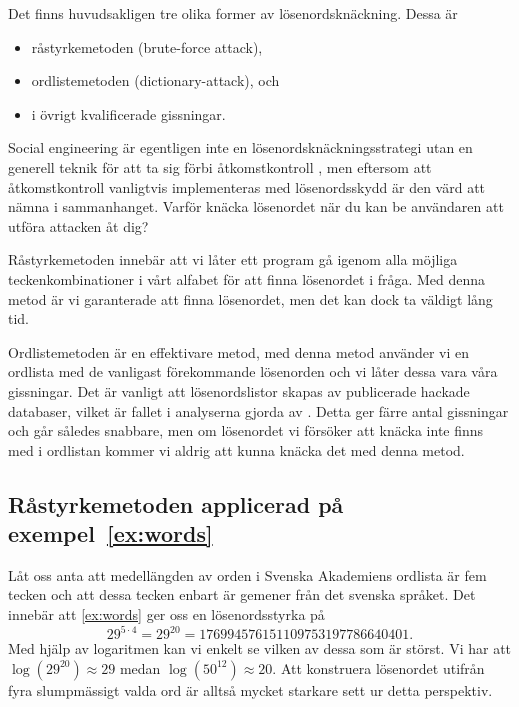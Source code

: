 Det finns huvudsakligen tre olika former av lösenordsknäckning.
Dessa är
\begin{itemize}
  \item råstyrkemetoden (brute-force attack),
  \item ordlistemetoden (dictionary-attack), och
  \item i övrigt kvalificerade gissningar.
\end{itemize}
\foreignlanguage{english}{Social engineering} är egentligen inte en 
lösenordsknäckningsstrategi utan en generell teknik för att ta sig förbi 
åtkomstkontroll \citep[s. 18]{Anderson2008sea}, men eftersom att 
åtkomstkontroll vanligtvis implementeras med lösenordsskydd är den värd att 
nämna i sammanhanget.
Varför knäcka lösenordet när du kan be användaren att utföra attacken åt dig?

Råstyrkemetoden innebär att vi låter ett program gå igenom alla möjliga 
teckenkombinationer i vårt alfabet för att finna lösenordet i fråga.
Med denna metod är vi garanterade att finna lösenordet, men det kan dock ta 
väldigt lång tid.

Ordlistemetoden är en effektivare metod, med denna metod använder vi en 
ordlista med de vanligast förekommande lösenorden och vi låter dessa vara våra 
gissningar.
Det är vanligt att lösenordslistor skapas av publicerade hackade databaser, 
vilket är fallet i analyserna gjorda av 
\citet{Cubrilovic2009rhf,Oberheide2010bao,Hunt2011abs,Cluley2012twp}.
Detta ger färre antal gissningar och går således snabbare, men om lösenordet vi 
försöker att knäcka inte finns med i ordlistan kommer vi aldrig att kunna 
knäcka det med denna metod.


\subsection{Råstyrkemetoden applicerad på exempel~\ref{ex:words}}

Låt oss anta att medellängden av orden i Svenska Akademiens ordlista är fem 
tecken och att dessa tecken enbart är gemener från det svenska språket.
Det innebär att \cref{ex:words} ger oss en lösenordsstyrka på
\begin{equation}\label{eq:AntalUtfallTecken}
  29^{5\cdot 4} = 29^{20} = 176994576151109753197786640401.
\end{equation}
Med hjälp av logaritmen kan vi enkelt se vilken av dessa som är störst.
Vi har att \(\log(29^{20}) \approx 29\) medan \(\log(50^{12}) \approx 20\).
Att konstruera lösenordet utifrån fyra slumpmässigt valda ord är alltså mycket 
starkare sett ur detta perspektiv.

